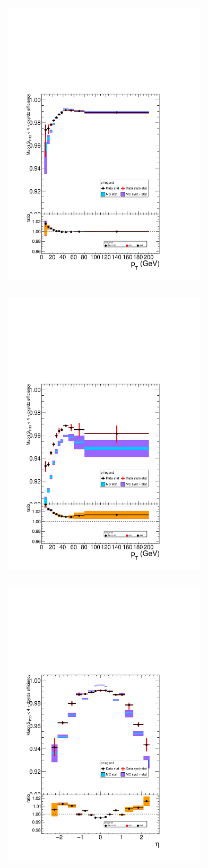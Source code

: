 \begin{figure}[tbh]
\centering
\begin{subfigure}{0.3\textwidth}
\centering
\includegraphics[width=2in]{Figures/Muons/mu_SIP4_barrel.pdf}
\caption{}
\end{subfigure}
\begin{subfigure}{0.3\textwidth}
\centering
\includegraphics[width=2in]{Figures/Muons/mu_SIP4_endcap.pdf}
\caption{}
\end{subfigure}
\begin{subfigure}{0.3\textwidth}
\centering
\includegraphics[width=2in]{Figures/Muons/mu_SIP4_pt20.pdf}

\end{subfigure}
\end{figure}
